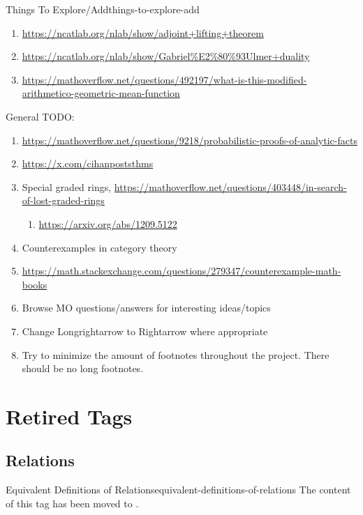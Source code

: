 \begin{remark}{Things To Explore/Add}{things-to-explore-add}
\begin{enumerate}
        \item \url{https://ncatlab.org/nlab/show/adjoint+lifting+theorem}
        \item \url{https://ncatlab.org/nlab/show/Gabriel\%E2\%80\%93Ulmer+duality}
        \item \url{https://mathoverflow.net/questions/492197/what-is-this-modified-arithmetico-geometric-mean-function}
    \end{enumerate}
    General TODO:
    \begin{enumerate}
        \item \url{https://mathoverflow.net/questions/9218/probabilistic-proofs-of-analytic-facts}
        \item \url{https://x.com/cihanpoststhms}
        \item Special graded rings, \url{https://mathoverflow.net/questions/403448/in-search-of-lost-graded-rings}
            \begin{enumerate}
                \item \url{https://arxiv.org/abs/1209.5122}
            \end{enumerate}
        \item Counterexamples in category theory
        \item \url{https://math.stackexchange.com/questions/279347/counterexample-math-books}
        \item Browse MO questions/answers for interesting ideas/topics
        \item Change Longrightarrow to Rightarrow where appropriate
        \item Try to minimize the amount of footnotes throughout the project. There should be no long footnotes.
    \end{enumerate}
\end{remark}
\section{Retired Tags}\label{section-retired-tags}
\subsection{Relations}\label{subsection-retired-tags-relations}
\begin{oldtag}{Equivalent Definitions of Relations}{equivalent-definitions-of-relations}%
    The content of this tag has been moved to .
\end{oldtag}
